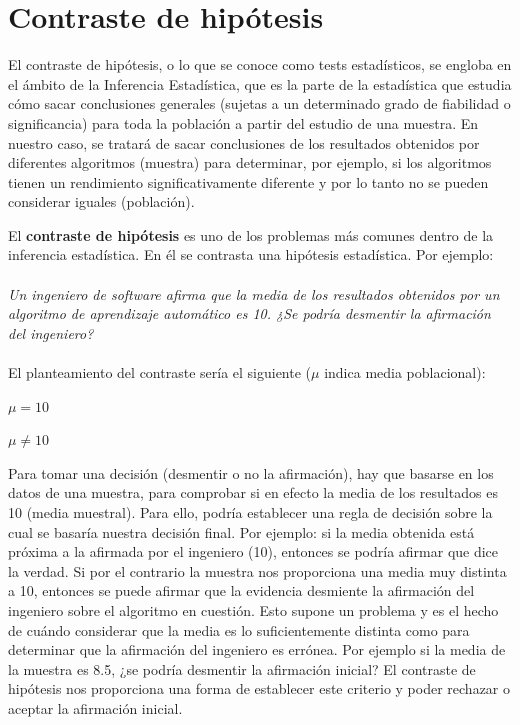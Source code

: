 
\chapter{Contraste de hipótesis}
El contraste de hipótesis, o lo que se conoce como tests estadísticos, se engloba en el ámbito de la
Inferencia Estadística, que es la parte de la estadística que estudia cómo sacar conclusiones generales
(sujetas a un determinado grado de fiabilidad o significancia) para toda la población a partir del
estudio de una muestra. En nuestro caso, se tratará de sacar conclusiones de los resultados obtenidos por
diferentes algoritmos (muestra) para determinar, por ejemplo, si los algoritmos tienen un rendimiento
significativamente diferente y por lo tanto no se pueden considerar iguales (población).

El \textbf{contraste de hipótesis} es uno de los problemas más comunes dentro de la inferencia
estadística. En él se contrasta una hipótesis estadística. Por ejemplo:\\\\
\textit{Un ingeniero de software afirma que la media de los resultados obtenidos por un algoritmo
de aprendizaje automático es 10. ¿Se podría desmentir la afirmación del ingeniero?}\\\\
El planteamiento del contraste sería el siguiente  ($\mu$ indica media poblacional):
\begin{center}
$ \mu = 10 $

$ \mu \neq 10 $
\end{center}

Para tomar una decisión (desmentir o no la afirmación), hay que basarse en los datos de una muestra, para
comprobar si en efecto la media de los resultados es 10 (media muestral). Para ello, podría establecer una
regla de decisión sobre la cual se basaría nuestra decisión final. Por ejemplo: si la media obtenida está
próxima a la afirmada por el ingeniero (10), entonces se podría afirmar que dice la verdad. Si por el
contrario la muestra nos proporciona una media muy distinta a 10, entonces se puede afirmar que la evidencia
desmiente la afirmación del ingeniero sobre el algoritmo en cuestión. Esto supone un problema y es el hecho
de cuándo considerar que la media es lo suficientemente distinta como para determinar que la afirmación del
ingeniero es errónea. Por ejemplo si la media de la muestra es 8.5, ¿se podría desmentir la afirmación
inicial? El contraste de hipótesis nos proporciona una forma de establecer este criterio y poder rechazar o
aceptar la afirmación inicial.

